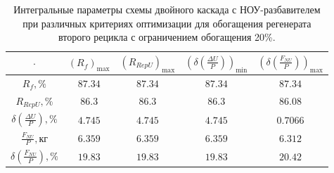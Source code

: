 \begin{table}
    \begin{tabular}{ccccc}
        $\cdot$ & $(R_f)_\text{max}$ & $(R_{RepU})_\text{max}$ & $(\delta(\frac{\Delta U}{P}))_\text{min}$ & $(\delta(\frac{F_{NU}}{P}))_\text{max}$\\ \hline
        $R_f, \%$ & $87.34$ & $87.34$ & $87.34$ & $87.34$\\ \hline
        $R_{RepU}, \%$ & $86.3$ & $86.3$ & $86.3$ & $86.08$\\ \hline
        $\delta(\frac{\Delta U}{P}), \%$ & $4.745$ & $4.745$ & $4.745$ & $0.7066$\\ \hline
        $\frac{F_{NU}}{P}, \text{кг}$ & $6.359$ & $6.359$ & $6.359$ & $6.312$\\ \hline
        $\delta(\frac{F_{NU}}{P}), \%$ & $19.83$ & $19.83$ & $19.83$ & $20.42$\\ \hline
    \end{tabular}
    \caption{Интегральные параметры схемы двойного каскада с НОУ-разбавителем при различных критериях оптимизации для обогащения регенерата второго рецикла с ограничением обогащения 20\%.{\label{2opt2_20_int}}}
\end{table}


